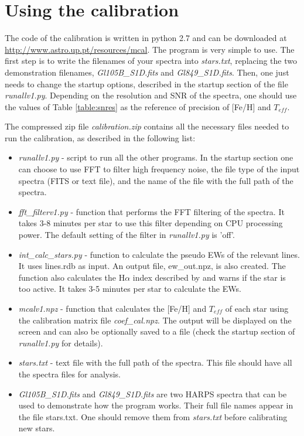 \documentclass[referee]{aa}
\begin{document}
\appendix

\section{Using the calibration}

The code of the calibration is written in python 2.7 and can be downloaded at \url{http://www.astro.up.pt/resources/mcal}. The program is very simple to use. The first step is to write the filenames of your spectra into \textit{stars.txt}, replacing the two demonstration filenames, \textit{Gl105B\_S1D.fits} and \textit{Gl849\_S1D.fits}. Then, one just needs to change the startup options, described in the startup section of the file \textit{runallv1.py}. Depending on the resolution and SNR of the spectra, one should use the values of Table \ref{table:snres} as the reference of precision of [Fe/H] and $T_{eff}$.

The compressed zip file \textit{calibration.zip} contains all the necessary files needed to run the calibration, as described in the following list:
\begin{itemize}
\item \textit{runallv1.py} - script to run all the other programs. In the startup section one can choose to use FFT to filter high frequency noise, the file type of the input spectra (FITS or text file), and the name of the file with the full path of the spectra.
\item \textit{fft\_filterv1.py} - function that performs the FFT filtering of the spectra.  It takes 3-8 minutes per star to use this filter depending on CPU processing power. The default setting of the filter in \textit{runallv1.py} is 'off'.
\item \textit{int\_calc\_stars.py} - function to calculate the pseudo EWs of the relevant lines. It uses lines.rdb as input. An output file, ew\_out.npz, is also created. The function also calculates the H$\alpha$ index described by \citet{Gomes_da_Silva-2011} and warns if the star is too active. It takes 3-5 minutes per star to calculate the EWs.
\item \textit{mcalv1.npz} - function that calculates the [Fe/H] and $T_{eff}$ of each star using the calibration matrix file \textit{coef\_cal.npz}. The output will be displayed on the screen and can also be optionally saved to a file (check the startup section of \textit{runallv1.py} for details). 
\item \textit{stars.txt} - text file with the full path of the spectra. This file should have all the spectra files for analysis.
\item \textit{Gl105B\_S1D.fits} and \textit{Gl849\_S1D.fits} are two HARPS spectra that can be used to demonstrate how the program works. Their full file names appear in the file stars.txt. One should remove them from \textit{stars.txt} before calibrating new stars.
\end{itemize}







\end{document}
